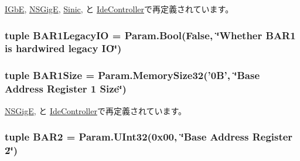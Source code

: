 \hyperlink{classEthernet_1_1IGbE_a0d644194139bee13ebf45d34542c1dfa}{IGbE}, \hyperlink{classEthernet_1_1NSGigE_a0d644194139bee13ebf45d34542c1dfa}{NSGigE}, \hyperlink{classEthernet_1_1Sinic_a0d644194139bee13ebf45d34542c1dfa}{Sinic}, と \hyperlink{classIde_1_1IdeController_a0d644194139bee13ebf45d34542c1dfa}{IdeController}で再定義されています。\hypertarget{classPci_1_1PciDevice_ad6224e7996cf1129f5001f1c99d88f2d}{
\subsubsection[{BAR1LegacyIO}]{\setlength{\rightskip}{0pt plus 5cm}tuple {\bf BAR1LegacyIO} = Param.Bool(False, \char`\"{}Whether {\bf BAR1} is hardwired legacy IO\char`\"{})}}
\label{classPci_1_1PciDevice_ad6224e7996cf1129f5001f1c99d88f2d}
\hypertarget{classPci_1_1PciDevice_a17a8d09c6d1486c3ecfd0f013a6d5dc2}{
\subsubsection[{BAR1Size}]{\setlength{\rightskip}{0pt plus 5cm}tuple {\bf BAR1Size} = Param.MemorySize32('0B', \char`\"{}Base Address Register 1 Size\char`\"{})}}
\label{classPci_1_1PciDevice_a17a8d09c6d1486c3ecfd0f013a6d5dc2}


\hyperlink{classEthernet_1_1NSGigE_afc69d648d33db96d14379bec42eb512e}{NSGigE}, と \hyperlink{classIde_1_1IdeController_afc69d648d33db96d14379bec42eb512e}{IdeController}で再定義されています。\hypertarget{classPci_1_1PciDevice_a50e0986fba3f6efbdbb66dea13ac4813}{
\subsubsection[{BAR2}]{\setlength{\rightskip}{0pt plus 5cm}tuple {\bf BAR2} = Param.UInt32(0x00, \char`\"{}Base Address Register 2\char`\"{})}}
\label{classPci_1_1PciDevice_a50e0986fba3f6efbdbb66dea13ac4813}


